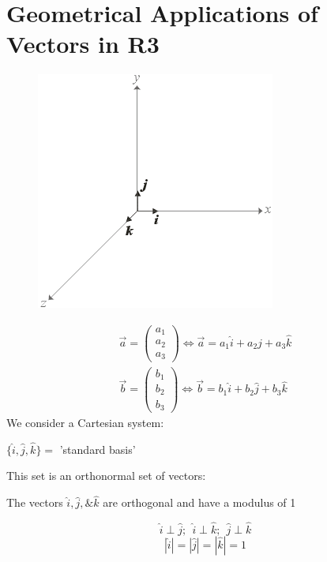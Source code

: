 \documentclass[a4paper, 11pt, normalem]{report}
\begin{document}
\section{Geometrical Applications of Vectors in R3}
\begin{figure}
    \begin{center}
        \includegraphics[scale=0.5]{Cart.png}
    \end{center}
\end{figure}
\begin{gather*}
    \vec{a} =
    \begin{pmatrix}
        a_1 \\
        a_2 \\
        a_3
    \end{pmatrix}
    \iff
    \vec{a} = a_{1}\hat{i} + a_{2}\hat{j} + a_{3}\hat{k} \\
    \vec{b} =
    \begin{pmatrix}
        b_1 \\
        b_2 \\
        b_3
    \end{pmatrix}
    \iff
    \vec{b} = b_{1}\hat{i} + b_{2}\hat{j} + b_{3}\hat{k}
\end{gather*}
We consider a Cartesian system:

$\{\hat{i}, \hat{j}, \hat{k}\} = $ 'standard basis'

This set is an orthonormal set of vectors:

The vectors $\hat{i}, \hat{j}, \& \hat{k}$ are orthogonal and have a modulus of 1

\begin{equation*}
    \hat{i} \perp \hat{j};~~ \hat{i} \perp \hat{k};~~ \hat{j} \perp \hat{k}
\end{equation*}
\begin{equation*}
    |\hat{i}| = |\hat{j}| = |\hat{k}| =  1
\end{equation*}
\end{document}
